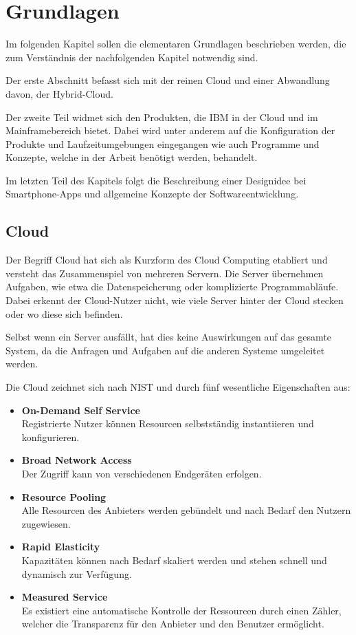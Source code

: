 \chapter{Grundlagen}
\label{cha:grundlagen}

Im folgenden Kapitel sollen die elementaren Grundlagen beschrieben werden, die zum Verständnis der nachfolgenden Kapitel
notwendig sind.

Der erste Abschnitt befasst sich mit der reinen Cloud und einer Abwandlung davon, der Hybrid-Cloud.

Der zweite Teil widmet sich den Produkten, die IBM in der Cloud und im Mainframebereich bietet. Dabei wird unter
anderem auf die Konfiguration der Produkte und Laufzeitumgebungen eingegangen wie auch Programme und Konzepte, welche in
der Arbeit benötigt werden, behandelt.

Im letzten Teil des Kapitels folgt die Beschreibung einer Designidee bei Smartphone-Apps und allgemeine Konzepte der
Softwareentwicklung.

\section{Cloud}
Der Begriff Cloud hat sich als Kurzform des Cloud Computing etabliert und versteht das Zusammenspiel von mehreren
Servern. Die Server übernehmen Aufgaben, wie etwa die Datenspeicherung oder komplizierte Programmabläufe. Dabei erkennt
der Cloud-Nutzer nicht, wie viele Server hinter der Cloud stecken oder wo diese sich befinden.

Selbst wenn ein Server ausfällt, hat dies keine Auswirkungen auf das gesamte System, da die Anfragen und Aufgaben auf
die anderen Systeme umgeleitet werden.

Die Cloud zeichnet sich nach NIST \cite{online_grundlagen_cloudNIST} und \cite{online_grundlagen_cloud} durch fünf
wesentliche Eigenschaften aus:

\begin{itemize}
    \item \textbf{On-Demand Self Service}   \\ Registrierte Nutzer können Resourcen selbstständig instantiieren und konfigurieren.
    \item \textbf{Broad Network Access}     \\ Der Zugriff kann von verschiedenen Endgeräten erfolgen.
    \item \textbf{Resource Pooling}         \\ Alle Resourcen des Anbieters werden gebündelt und nach Bedarf den Nutzern zugewiesen.
    \item \textbf{Rapid Elasticity}         \\ Kapazitäten können nach Bedarf skaliert werden und stehen schnell und dynamisch zur Verfügung.
    \item \textbf{Measured Service}         \\ Es existiert eine automatische Kontrolle der Ressourcen durch einen Zähler, welcher die Transparenz für den Anbieter und den Benutzer ermöglicht.
\end{itemize}

